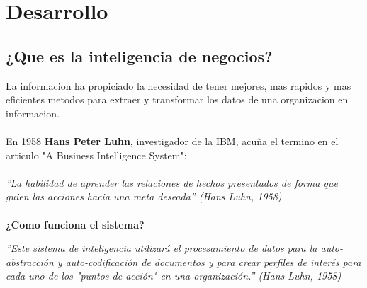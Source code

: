 \documentclass[twoside,twocolumn]{article}
\begin{document}

\section{Desarrollo}

\subsection{¿Que es la inteligencia de negocios?}

La informacion ha propiciado la necesidad de tener mejores, mas rapidos y mas eficientes metodos para extraer y transformar los datos de una organizacion en informacion.
\\ \\
En 1958 \textbf{Hans Peter Luhn}, investigador de la IBM, acuña el termino en el articulo "A Business Intelligence System":
\\ \\
\textsl{''La habilidad de aprender las relaciones de hechos presentados de forma que guien las acciones hacia una meta deseada'' (Hans Luhn, 1958)} \\ \\

 \textbf{ ¿Como funciona el sistema?}

\textsl{''Este sistema de inteligencia utilizará el procesamiento de datos para la auto-abstracción y auto-codificación de documentos y para crear perfiles de interés para cada uno de los "puntos de acción" en una organización.'' (Hans Luhn, 1958)}
\\ \\
\end{document}
